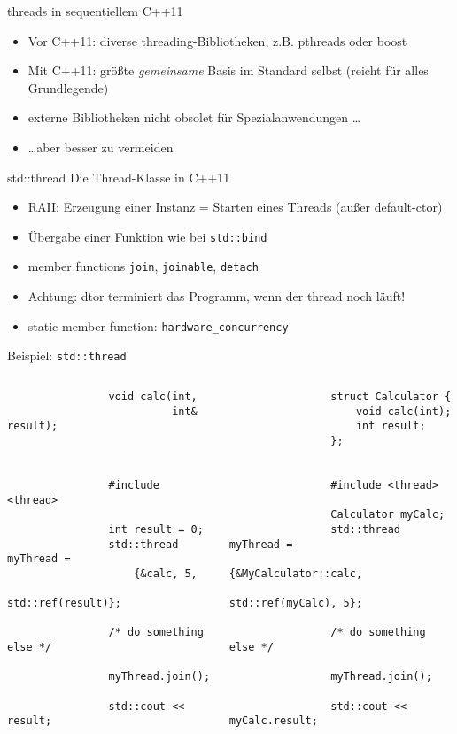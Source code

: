 \begin{frame}{threads in sequentiellem C++11}
	\begin{itemize}
		\item Vor C++11: diverse threading-Bibliotheken, z.B. pthreads oder boost
		\item Mit C++11: größte \emph{gemeinsame} Basis im Standard selbst (reicht für alles Grundlegende)
		\item externe Bibliotheken nicht obsolet für Spezialanwendungen \dots
		\item \dots aber besser zu vermeiden
	\end{itemize}
	
	\pause
	
	\begin{block}{std::thread}
		Die Thread-Klasse in C++11
		\begin{itemize}
			\item RAII: Erzeugung einer Instanz = Starten eines Threads (außer default-ctor)
			\item Übergabe einer Funktion wie bei \texttt{std::bind}
			\item member functions \texttt{join}, \texttt{joinable}, \texttt{detach}
			\item Achtung: dtor terminiert das Programm, wenn der thread noch läuft!
			\item static member function: \texttt{hardware\_concurrency}
		\end{itemize}
	\end{block}
\end{frame}

\begin{frame}[fragile]{Beispiel: \texttt{std::thread}}
	\begin{columns}[b]
			\begin{lstlisting}
				void calc(int,
				          int& result);
				
				
				
				#include <thread>
				
				int result = 0;
				std::thread myThread =
				    {&calc, 5, 
				     std::ref(result)};
					 
				/* do something else */
				
				myThread.join();
				
				std::cout << result;
			\end{lstlisting}
		
		\pause
		
			\begin{lstlisting}
				struct Calculator {
				    void calc(int);
				    int result;
				};
				
				
				#include <thread>
				
				Calculator myCalc;
				std::thread myThread =
				    {&MyCalculator::calc, 
				     std::ref(myCalc), 5};
				
				/* do something else */
				
				myThread.join();
				
				std::cout << myCalc.result;
			\end{lstlisting}
	\end{columns}
\end{frame}

